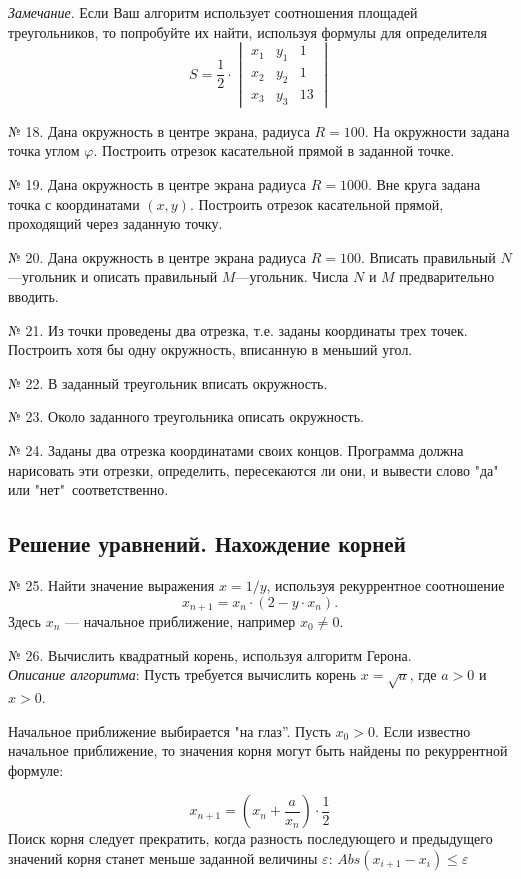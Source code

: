 {{\em Замечание}.   Если Ваш алгоритм использует соотношения площадей треугольников, то попробуйте их найти, используя формулы для определителя
$$S = \frac{1}{2} 
\cdot\begin{vmatrix} 
    x_1 & y_1 & 1\\
    x_2 & y_2 & 1\\
    x_3 & y_3 & 13
\end{vmatrix}
$$

№ 18. Дана окружность в центре экрана, радиуса $R=100$.  На окружности задана точка углом $\varphi$. Построить отрезок касательной прямой в заданной точке.


№ 19. Дана окружность в центре экрана радиуса $R=100$0. Вне круга задана точка с координатами $(x,y)$. Построить отрезок касательной прямой, проходящий через заданную точку.

№ 20. Дана окружность в центре экрана радиуса $R=100$. Вписать правильный $N$ ---угольник и описать правильный $M$---угольник. Числа $N$ и $M$ предварительно вводить.

№ 21. Из точки проведены два отрезка, т.е. заданы координаты трех точек. Построить хотя бы одну окружность, вписанную в меньший угол.

№ 22. В заданный треугольник вписать окружность.

№ 23. Около заданного треугольника описать окружность.

№ 24. Заданы два отрезка координатами своих концов. Программа должна нарисовать эти отрезки, определить, пересекаются ли они, и вывести слово "да" \: или "нет"\ соответственно. 

\subsection{Решение уравнений. Нахождение корней}

№ 25. Найти значение выражения $x = 1/y$, используя рекуррентное соотношение 
$$x_{n+1} = x_n\cdot (2 - y\cdot x_n).$$ 
Здесь $x_n$ --- начальное приближение, например $x_0\neq 0$.

№ 26. Вычислить квадратный корень, используя алгоритм Герона.\\ {\it Описание алгоритма}: Пусть требуется вычислить корень $x = \sqrt{a}$, где $a>0$ и $x>0$.
 
Начальное   приближение выбирается "на глаз”. Пусть  $x_0 > 0$. Если известно начальное приближение, то значения корня могут быть найдены по рекуррентной формуле:

$$x_{n+1} = \left(x_n + \frac{a}{x_n}\right)\cdot\frac{1}{2}$$
Поиск корня следует прекратить, когда разность последующего и предыдущего значений корня станет меньше заданной величины $\varepsilon$:
$Abs(x_{i+1}-x_i)\leq\varepsilon$

}
